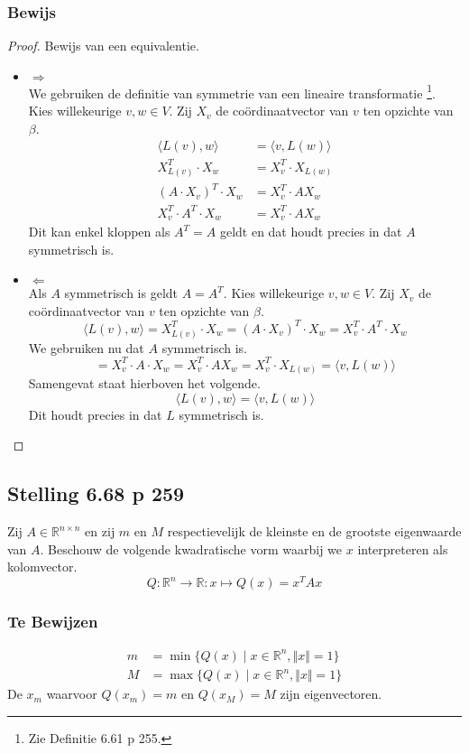\documentclass[lineaire_algebra_oplossingen.tex]{subfiles}
\begin{document}
\subsubsection*{Bewijs}
\begin{proof}
Bewijs van een equivalentie.\\
\begin{itemize}
\item $\Rightarrow$\\
We gebruiken de definitie van symmetrie van een lineaire transformatie \footnote{Zie Definitie 6.61 p 255.}.
Kies willekeurige $v,w \in V$. Zij $X_v$ de co\"ordinaatvector van $v$ ten opzichte van $\beta$.
\begin{align*}
\langle L(v),w \rangle &= \langle v,L(w)\rangle \\
X_{L(v)}^T \cdot X_w &= X_v^T \cdot X_{L(w)} \\
(A \cdot X_v)^T \cdot X_w &= X_v^T \cdot A X_w \\
X_v^T \cdot A^T \cdot X_w &= X_v^T \cdot A X_w
\end{align*}
Dit kan enkel kloppen als $A^T = A$ geldt en dat houdt precies in dat $A$ symmetrisch is.

\item $\Leftarrow$\\
Als $A$ symmetrisch is geldt $A = A^T$. Kies willekeurige $v,w \in V$. Zij $X_v$ de co\"ordinaatvector van $v$ ten opzichte van $\beta$.
\[
\langle L(v),w \rangle = X_{L(v)}^T \cdot X_w = (A \cdot X_v)^T \cdot X_w =  X_v^T \cdot A^T \cdot X_w 
\]
We gebruiken nu dat $A$ symmetrisch is.
\[
=  X_v^T \cdot A \cdot X_w = X_v^T \cdot A X_w = X_v^T \cdot X_{L(w)} = \langle v,L(w)\rangle
\]
Samengevat staat hierboven het volgende.
\[
\langle L(v),w \rangle = \langle v,L(w)\rangle
\]
Dit houdt precies in dat $L$ symmetrisch is.
\end{itemize}
\end{proof}

\subsection{Stelling 6.68 p 259}
Zij $A \in \mathbb{R}^{n\times n}$ en zij $m$ en $M$ respectievelijk de kleinste en de grootste eigenwaarde van $A$.
Beschouw de volgende kwadratische vorm  waarbij we $x$ interpreteren als kolomvector.
\[
Q:\mathbb{R}^n \rightarrow \mathbb{R}:x \mapsto Q(x) = x^TAx
\]

\subsubsection*{Te Bewijzen}
\begin{align*}
m &= \min\{ Q(x) \mid x \in \mathbb{R}^n, \Vert x\Vert = 1\} \\
M &= \max\{ Q(x) \mid x \in \mathbb{R}^n, \Vert x\Vert = 1\}
\end{align*}
De $x_m$ waarvoor $Q(x_m)=m$ en $Q(x_M)=M$ zijn eigenvectoren. 
\end{document}
